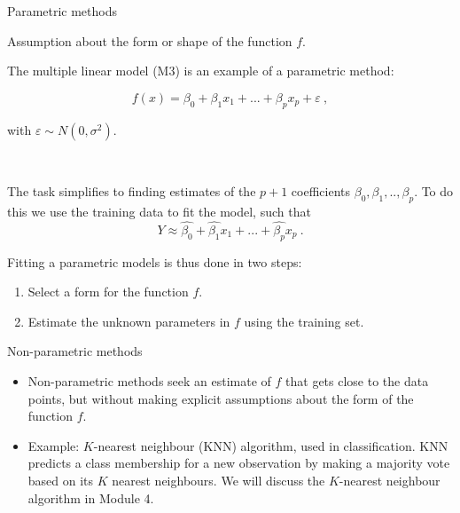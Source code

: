 \documentclass[
  ignorenonframetext,
]{beamer}
\providecommand{\tightlist}{%
  \setlength{\itemsep}{0pt}\setlength{\parskip}{0pt}}
\begin{document}
\begin{frame}
\begin{block}{Parametric methods}
\protect\hypertarget{parametric-methods}{}
\(~\)

Assumption about the form or shape of the function \(f\).

The multiple linear model (M3) is an example of a parametric method:

\[f(x) = \beta_0 + \beta_1 x_1 + ... + \beta_p x_p+\varepsilon \ , \]

with \(\varepsilon \sim N(0,\sigma^2)\).

\(~\)

The task simplifies to finding estimates of the \(p+1\) coefficients
\(\beta_0, \beta_1, .. ,\beta_p\). To do this we use the training data
to fit the model, such that
\[Y \approx \hat{\beta_0} + \hat{\beta_1} x_1 + ... + \hat{\beta_p} x_p \ .\]
\end{block}
\end{frame}

\begin{frame}
Fitting a parametric models is thus done in two steps:

\begin{enumerate}
\tightlist
\item
  Select a form for the function \(f\).\\
\item
  Estimate the unknown parameters in \(f\) using the training set.
\end{enumerate}
\end{frame}

\begin{frame}
\begin{block}{Non-parametric methods}
\protect\hypertarget{non-parametric-methods}{}
\(~\)

\begin{itemize}
\tightlist
\item
  Non-parametric methods seek an estimate of \(f\) that gets close to
  the data points, but without making explicit assumptions about the
  form of the function \(f\).
\end{itemize}

\vspace{2mm}

\begin{itemize}
\tightlist
\item
  Example: \(K\)-nearest neighbour (KNN) algorithm, used in
  classification. KNN predicts a class membership for a new observation
  by making a majority vote based on its \(K\) nearest neighbours. We
  will discuss the \(K\)-nearest neighbour algorithm in Module 4.
\end{itemize}
\end{block}
\end{frame}
\end{document}
